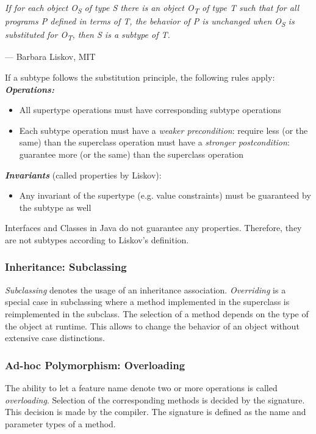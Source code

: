 \textit{If for each object O\textsubscript{S} of type S there is an object O\textsubscript{T} of type T	such that for all programs P	defined in terms of T, the behavior	of P is unchanged when O\textsubscript{S} is	substituted for O\textsubscript{T}, then S is a subtype of T.}\newline
\begin{flushright}
	--- Barbara Liskov, MIT
\end{flushright}

If a subtype follows the substitution principle, the following rules apply:\newline
\textbf{\textit{Operations:}}
\begin{itemize}[topsep=5pt, itemsep=0pt]
	\item All supertype operations must have corresponding subtype
	operations
	\item Each subtype operation
	\subitem must have a \textit{weaker precondition}: require less (or the	same) than the superclass operation
	\subitem must have a \textit{stronger postcondition}: guarantee more (or the same) than the superclass operation
\end{itemize}
\textbf{\textit{Invariants}} (called properties by Liskov):
\begin{itemize}[topsep=5pt, itemsep=0pt]
	\item Any invariant of the supertype (e.g. value constraints) must be guaranteed by the subtype as well
\end{itemize}

Interfaces and Classes in Java do not guarantee any properties. Therefore, they are not subtypes according to Liskov’s definition.

\subsubsection*{Inheritance: Subclassing}
\textit{Subclassing} denotes the usage of an inheritance association.
\textit{Overriding} is a special case in subclassing where a method implemented in the superclass is reimplemented in the subclass.
The selection of a method depends on the type of the object at runtime.
This allows to change the behavior of an object without extensive case distinctions.

\subsubsection*{Ad-hoc Polymorphism: Overloading}
The ability to let a feature name denote two or more operations is called \textit{overloading}.
Selection of the corresponding methods is decided by the signature.
This decision is made by the compiler.
The signature is defined as the name and parameter types of a method.


